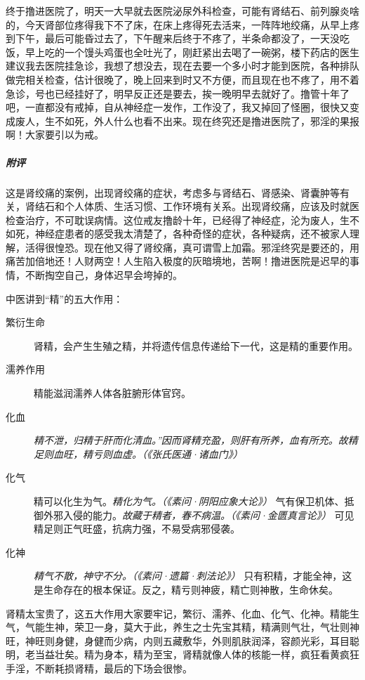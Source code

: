 \begin{case}
    终于撸进医院了，明天一大早就去医院泌尿外科检查，可能有肾结石、前列腺炎啥的，今天肾部位疼得我下不了床，在床上疼得死去活来，一阵阵地绞痛，从早上疼到下午，最后可能昏过去了，下午醒来后终于不疼了，半条命都没了，一天没吃饭，早上吃的一个馒头鸡蛋也全吐光了，刚赶紧出去喝了一碗粥，楼下药店的医生建议我去医院挂急诊，我想了想没去，现在去要一个多小时才能到医院，各种排队做完相关检查，估计很晚了，晚上回来到时又不方便，而且现在也不疼了，用不着急诊，号也已经挂好了，明早反正还是要去，挨一晚明早去就好了。撸管十年了吧，一直都没有戒掉，自从神经症一发作，工作没了，我又掉回了怪圈，很快又变成废人，生不如死，外人什么也看不出来。现在终究还是撸进医院了，邪淫的果报啊！大家要引以为戒。
    \subparagraph{附评} 这是肾绞痛的案例，出现肾绞痛的症状，考虑多与肾结石、肾感染、肾囊肿等有关，肾结石和个人体质、生活习惯、工作环境有关系。出现肾绞痛，应该及时就医检查治疗，不可耽误病情。这位戒友撸龄十年，已经得了神经症，沦为废人，生不如死，神经症患者的感受我太清楚了，各种奇怪的症状，各种疑病，还不被家人理解，活得很惶恐。现在他又得了肾绞痛，真可谓雪上加霜。邪淫终究是要还的，用痛苦加倍地还！人财两空！人生陷入极度的灰暗境地，苦啊！撸进医院是迟早的事情，不断掏空自己，身体迟早会垮掉的。

    中医讲到“精”的五大作用：\begin{description}
        \item[繁衍生命] 肾精，会产生生殖之精，并将遗传信息传递给下一代，这是精的重要作用。
        \item[濡养作用] 精能滋润濡养人体各脏腑形体官窍。
        \item[化血] \textit{精不泄，归精于肝而化清血。”因而肾精充盈，则肝有所养，血有所充。故精足则血旺，精亏则血虚。（《张氏医通·诸血门》）}
        \item[化气] 精可以化生为气。\textit{精化为气。（《素问·阴阳应象大论》）} 气有保卫机体、抵御外邪入侵的能力。\textit{故藏于精者，春不病温。（《素问·金匮真言论》）} 可见精足则正气旺盛，抗病力强，不易受病邪侵袭。
        \item[化神] \textit{精气不散，神守不分。（《素问·遗篇·刺法论》）} 只有积精，才能全神，这是生命存在的根本保证。反之，精亏则神疲，精亡则神散，生命休矣。
    \end{description} 肾精太宝贵了，这五大作用大家要牢记，繁衍、濡养、化血、化气、化神。精能生气，气能生神，荣卫一身，莫大于此，养生之士先宝其精，精满则气壮，气壮则神旺，神旺则身健，身健而少病，内则五藏敷华，外则肌肤润泽，容颜光彩，耳目聪明，老当益壮矣。精为身本，精为至宝，肾精就像人体的核能一样，疯狂看黄疯狂手淫，不断耗损肾精，最后的下场会很惨。
\end{case}

